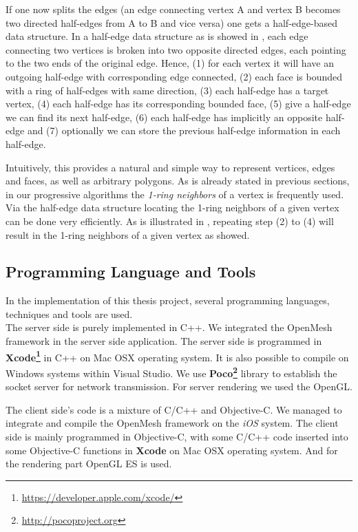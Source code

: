 If one now splits the edges (\ie an edge connecting vertex A and vertex B becomes two directed half-edges from A to B and vice versa) one gets a half-edge-based data structure. In a half-edge data structure as is showed in , each edge connecting two vertices is broken into two opposite directed edges, each pointing to the two ends of the original edge. Hence, (1) for each vertex it will have an outgoing half-edge with corresponding edge connected, (2) each face is bounded with a ring of half-edges with same direction, (3) each half-edge has a target vertex, (4) each half-edge has its corresponding bounded face, (5) give a half-edge we can find its next half-edge, (6) each half-edge has implicitly an opposite half-edge and (7) optionally we can store the previous half-edge information in each half-edge. 


Intuitively, this provides a natural and simple way to represent vertices, edges and faces, as well as arbitrary polygons. As is already stated in previous sections, in our progressive algorithms the \emph{1-ring neighbors} of a vertex is frequently used. Via the half-edge data structure locating the 1-ring neighbors of a given vertex can be done very efficiently. As is illustrated in , repeating step (2) to (4) will result in the 1-ring neighbors of a given vertex as showed. 


\subsection{Programming Language and Tools}
\label{section:progTools}

In the implementation of this thesis project, several programming languages, techniques and tools are used. \\

The server side is purely implemented in C++. We integrated the OpenMesh framework in the server side application. The server side is programmed in \textbf{Xcode\footnote{\label{XCODE}\url{https://developer.apple.com/xcode/}} } in C++ on Mac OSX operating system. It is also possible to compile on Windows systems within Visual Studio. We use  \textbf{Poco\footnote{\label{POCO}\url{http://pocoproject.org}} } library to establish the socket server for network transmission. For server rendering we used the OpenGL. 

The client side's code is a mixture of C/C++ and Objective-C. We managed to integrate and compile the OpenMesh framework on the \emph{iOS} system. The client side is mainly programmed in Objective-C, with some C/C++ code inserted into some Objective-C functions in \textbf{Xcode} on Mac OSX operating system. And for the rendering part OpenGL ES is used. 

